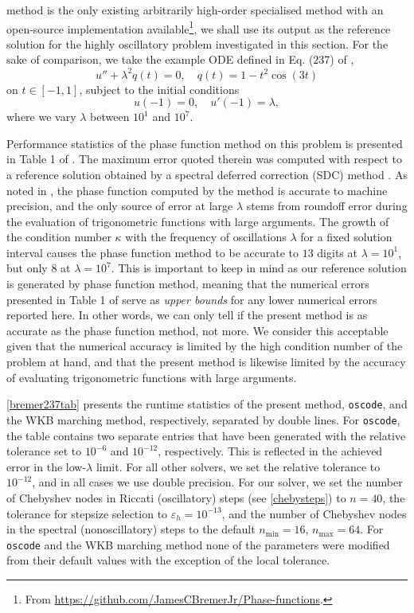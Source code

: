 \documentclass[10pt]{article}
\newcommand{\be}{\begin{equation}}
\newcommand{\ee}{\end{equation}}
\begin{document}
method is the only existing 
arbitrarily high-order specialised method with an open-source implementation
available\footnote{From
\url{https://github.com/JamesCBremerJr/Phase-functions}.}, we shall use its
output as the reference solution for the highly oscillatory problem
investigated in this section. For the sake of comparison, we take the example
ODE defined in Eq. (237) of \cite{bremer2018},
\be\label{bremer237eq}
u'' + \lambda^2 q(t) = 0, \quad q(t) = 1 - t^2\cos(3t)
\ee
on $t \in [-1, 1]$, subject to the initial conditions
\be\label{bremer237ic}
u(-1) = 0, \quad u'(-1) = \lambda,
\ee
where we vary $\lambda$ between $10^1$ and $10^7$.

Performance statistics of the phase function method on this problem is presented in
Table 1 of \cite{bremer2018}. The maximum error quoted therein was computed
with respect to a reference solution obtained by a spectral deferred correction
(SDC) method \cite{dutt2000}. As noted in \cite{bremer2018}, the phase function
computed by the method is accurate to machine precision, and the only source of
error at large $\lambda$ stems from roundoff error during the evaluation of
trigonometric functions with large arguments. The growth of the condition number $\kappa$ with the frequency of oscillations $\lambda$ for a fixed solution interval causes the phase function method to
be accurate to $13$ digits at $\lambda = 10^1$, but only $8$  at $\lambda =
10^7$. This is important to keep in mind as our reference solution is generated
by phase function method, meaning that the numerical errors presented in Table
1 of \cite{bremer2018} serve as \emph{upper bounds} for any lower numerical
errors reported here. In other words, we can only tell if the present method is
as accurate as the phase function method, not more. We consider this acceptable
given that the numerical accuracy is limited by the high condition number of
the problem at hand, and that the present method is likewise limited by
the accuracy of evaluating trigonometric functions with large arguments.

\cref{bremer237tab} presents the runtime statistics of the present method,
\texttt{oscode}, and the WKB marching method, respectively, separated by double
lines. For \texttt{oscode}, the table contains two separate entries that have
been generated with the relative tolerance set to $10^{-6}$ and $10^{-12}$,
respectively. This is reflected in the achieved error in the low-$\lambda$
limit. For all other solvers, we set the relative tolerance to $10^{-12}$, and
in all cases we use double precision. For our solver, we set the number of
Chebyshev nodes in Riccati (oscillatory) steps (see \cref{chebysteps}) to $n = 40$, the
tolerance for stepsize selection to $\varepsilon_h = 10^{-13}$, and the number
of Chebyshev nodes in the spectral (nonoscillatory) steps to the default
$n_{\text{min}} = 16$, $n_{\text{max}} = 64$. For \texttt{oscode} and the WKB
marching method none of the parameters were modified from their default values
with the exception of the local tolerance.
\end{document}
